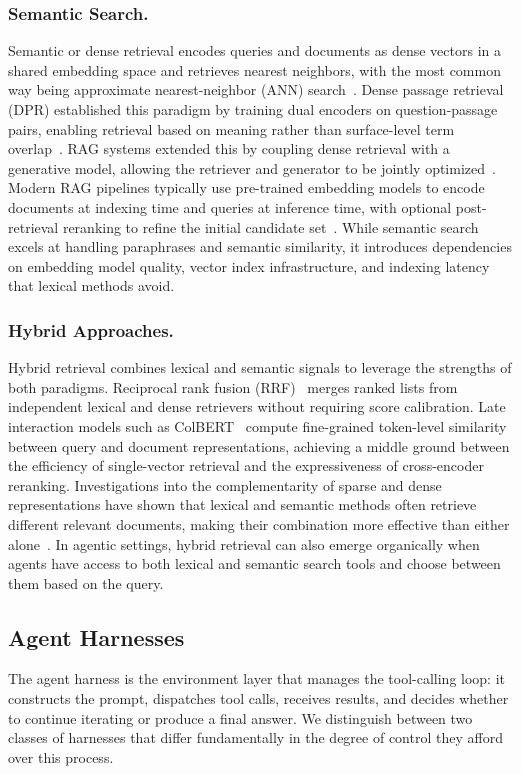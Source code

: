 \documentclass[sigconf,nonacm]{acmart}
\begin{document}
\subsubsection{Semantic Search.}
Semantic or dense retrieval encodes queries and documents as dense vectors in a shared embedding space and retrieves nearest neighbors, with the most common way being approximate nearest-neighbor (ANN) search~\cite{karpukhin2020dpr}. Dense passage retrieval (DPR) established this paradigm by training dual encoders on question-passage pairs, enabling retrieval based on meaning rather than surface-level term overlap~\cite{karpukhin2020dpr}. RAG systems extended this by coupling dense retrieval with a generative model, allowing the retriever and generator to be jointly optimized~\cite{lewis2020rag}. Modern RAG pipelines typically use pre-trained embedding models to encode documents at indexing time and queries at inference time, with optional post-retrieval reranking to refine the initial candidate set~\cite{gao2024ragsurvey,wang2024ragbestpractices}. While semantic search excels at handling paraphrases and semantic similarity, it introduces dependencies on embedding model quality, vector index infrastructure, and indexing latency that lexical methods avoid.

\subsubsection{Hybrid Approaches.}
Hybrid retrieval combines lexical and semantic signals to leverage the strengths of both paradigms. Reciprocal rank fusion (RRF)~\cite{cormack2009rrf,frtr2026} merges ranked lists from independent lexical and dense retrievers without requiring score calibration. Late interaction models such as ColBERT~\cite{khattab2020colbert} compute fine-grained token-level similarity between query and document representations, achieving a middle ground between the efficiency of single-vector retrieval and the expressiveness of cross-encoder reranking. Investigations into the complementarity of sparse and dense representations have shown that lexical and semantic methods often retrieve different relevant documents, making their combination more effective than either alone~\cite{luan2021sparse}. In agentic settings, hybrid retrieval can also emerge organically when agents have access to both lexical and semantic search tools and choose between them based on the query.

\subsection{Agent Harnesses}
\label{sec:harnesses}
The agent harness is the environment layer that manages the tool-calling loop: it constructs the prompt, dispatches tool calls, receives results, and decides whether to continue iterating or produce a final answer. We distinguish between two classes of harnesses that differ fundamentally in the degree of control they afford over this process.
\end{document}
